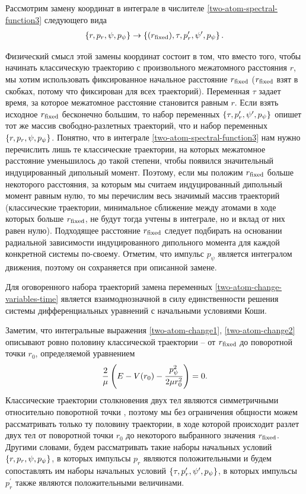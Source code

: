 Рассмотрим замену координат в интеграле в числителе \eqref{two-atom-spectral-function3} следующего вида
\begin{gather}
    \left\{ r, p_r, \psi, p_\psi \right\} \rightarrow \left\{ (r_\text{fixed}), \tau, p_r^\prime, \psi^\prime, p_\psi \right\} \label{two-atom-change-variables-time}.
\end{gather}

Физический смысл этой замены координат состоит в том, что вместо того, чтобы начинать классическую траекторию с произвольного межатомного расстояния $r$, мы хотим использовать фиксированное начальное расстояние $r_\text{fixed}$ ($r_\text{fixed}$ взят в скобках, потому что фиксирован для всех траекторий). Переменная $\tau$ задает время, за которое межатомное расстояние становится равным $r$. Если взять исходное $r_\text{fixed}$ бесконечно большим, то набор переменных $\left\{ \tau, p_r^\prime, \psi^\prime, p_\psi \right\}$ опишет тот же массив свободно-разлетных траекторий, что и набор переменных $\left\{ r, p_r, \psi, p_\psi \right\}$. Понятно, что в интеграле \eqref{two-atom-spectral-function3} нам нужно перечислить лишь те классические траектории, на которых межатомное расстояние уменьшилось до такой степени, чтобы появился значительный индуцированный дипольный момент. Поэтому, если мы положим $r_\text{fixed}$ больше некоторого расстояния, за которым мы считаем индуцированный дипольный момент равным нулю, то мы перечислим весь значимый массив траекторий (классические траектории, минимальное сближение между атомами в ходе которых больше $r_\text{fixed}$, не будут тогда учтены в интеграле, но и вклад от них равен нулю). Подходящее расстояние $r_\text{fixed}$ следует подбирать на основании радиальной зависимости индуцированного дипольного момента для каждой конкретной системы по-своему. Отметим, что импульс $p_\psi$ является интегралом движения, поэтому он сохраняется при описанной замене. \par
Для оговоренного набора траекторий замена переменных \eqref{two-atom-change-variables-time} является взаимоднозначной в силу единственности решения системы дифференциальных уравнений с начальными условиями Коши. \par
Заметим, что интегральные выражения \eqref{two-atom-change1}, \eqref{two-atom-change2} описывают ровно половину классической траектории -- от $r_\text{fixed}$ до поворотной точки $r_0$, определяемой уравнением
\begin{gather}
    \frac{2}{\mu} \left( E - V(r_0) - \frac{p_\psi^2}{2 \mu r_0^2} \right) = 0.
\end{gather}
Классические траектории столкновения двух тел являются симметричными относительно поворотной точки \cite{goldstein}, поэтому мы без ограничения общности можем рассматривать только ту половину траектории, в ходе которой происходит разлет двух тел от поворотной точки $r_0$ до некоторого выбранного значения $r_\text{fixed}$. Другими словами, будем рассматривать такие наборы начальных условий $\left\{ r, p_r, \psi, p_\psi \right\}$,  в которых импульсы $p_r$ являются положительными и будем сопоставлять им наборы начальных условий $\left\{ \tau, p_r^\prime, \psi^\prime, p_\psi \right\}$, в которых импульсы $p_r^\prime$ также являются положительными величинами. \par
